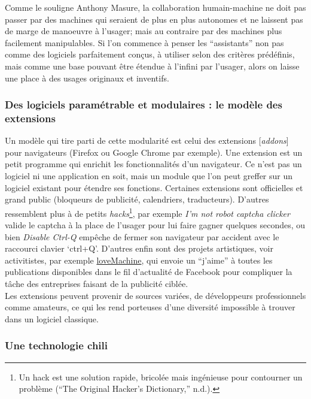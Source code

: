 \documentclass[]{article}
\begin{document}
Comme le souligne Anthony Masure, la collaboration humain-machine ne
doit pas passer par des machines qui seraient de plus en plus autonomes
et ne laissent pas de marge de manoeuvre à l'usager; mais au contraire
par des machines plus facilement manipulables. Si l'on commence à penser
les ``assistants'' non pas comme des logiciels parfaitement conçus, à
utiliser selon des critères prédéfinis, mais comme une base pouvant être
étendue à l'infini par l'usager, alors on laisse une place à des usages
originaux et inventifs.

\hypertarget{des-logiciels-paramuxe9trable-et-modulaires-le-moduxe8le-des-extensions}{%
\subsubsection{Des logiciels paramétrable et modulaires : le modèle des
extensions}\label{des-logiciels-paramuxe9trable-et-modulaires-le-moduxe8le-des-extensions}}

Un modèle qui tire parti de cette modularité est celui des extensions
{[}\emph{addons}{]} pour navigateurs (Firefox ou Google Chrome par
exemple). Une extension est un petit programme qui enrichit les
fonctionnalités d'un navigateur. Ce n'est pas un logiciel ni une
application en soit, mais un module que l'on peut greffer sur un
logiciel existant pour étendre ses fonctions. Certaines extensions sont
officielles et grand public (bloqueurs de publicité, calendriers,
traducteurs). D'autres ressemblent plus à de petits
\emph{hacks}\footnote{Un hack est une solution rapide, bricolée mais
  ingénieuse pour contourner un problème (``The Original Hacker's
  Dictionary,'' n.d.).}, par exemple \emph{I'm not robot captcha
clicker} valide le captcha à la place de l'usager pour lui faire gagner
quelques secondes, ou bien \emph{Disable Ctrl-Q} empêche de fermer son
navigateur par accident avec le raccourci clavier `ctrl+Q'. D'autres
enfin sont des projets artistiques, voir activitistes, par exemple
\href{http://lovemachine.cc/}{loveMachine}, qui envoie un ``j'aime'' à
toutes les publications disponibles dans le fil d'actualité de Facebook
pour compliquer la tâche des entreprises faisant de la publicité
ciblée.\\
Les extensions peuvent provenir de sources variées, de développeurs
professionnels comme amateurs, ce qui les rend porteuses d'une diversité
impossible à trouver dans un logiciel classique.

\hypertarget{une-technologie-chili}{%
\subsubsection{Une technologie chili}\label{une-technologie-chili}}
\end{document}
